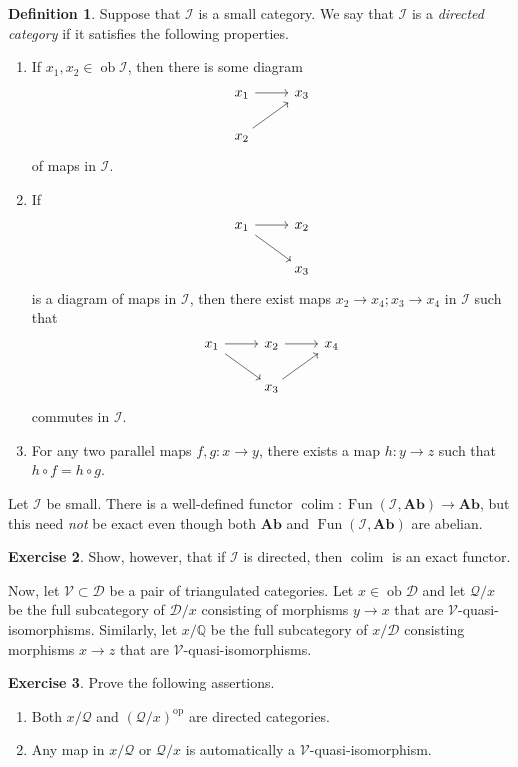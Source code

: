 \documentclass[10pt,letterpaper,cm]{nupset}
\theoremstyle{definition}
\newtheorem{definition}{Definition}[subsection]
\theoremstyle{theorem}
\newtheorem{exercise}[definition]{Exercise}
\theoremstyle{remark}
\newcommand{\Q}{\mathbb Q}
\newcommand{\1}{\mathbf{1}}
\renewcommand{\d}{\mathscr{D}}
\renewcommand{\i}{\mathscr{I}}
\newcommand{\q}{\mathscr{Q}}
\renewcommand{\v}{\mathscr{V}}
\newcommand{\0}{\vec 0}
\DeclareMathOperator{\op}{op}
\DeclareMathOperator{\ob}{ob}
\DeclareMathOperator{\Fun}{Fun}
\DeclareMathOperator{\colim}{colim}
\begin{document}
\begin{definition}
Suppose that $\i$ is a small category. We say that $\i$ is a \textit{directed category} if it satisfies the following properties.
\begin{enumerate}[label=(\arabic*)]
\item If $x_1, x_2 \in \ob{\i}$, then there is some diagram 
\[
\begin{tikzcd}
x_1 \arrow[r]  & x_3 \\
x_2 \arrow[ru] &    
\end{tikzcd}
\] of maps in $\i$.
\item If 
\[
\begin{tikzcd}
x_1 \arrow[r] \arrow[rd] & x_2 \\
                         & x_3
\end{tikzcd}
\] is a diagram of maps in $\i$, then there exist maps $x_2 \to x_4; x_3 \to x_4$ in $\i$ such that 
\[
\begin{tikzcd}
x_1 \arrow[r] \arrow[rd] & x_2 \arrow[r]  & x_4 \\
                         & x_3 \arrow[ru] &    
\end{tikzcd}
\] commutes in $\i$.
\item For any two parallel maps $f,g : x \to y$, there exists a map $h: y \to z$ such that $h \circ f = h \circ g$. 
\end{enumerate}
\end{definition}

\smallskip

Let $\i$ be small. There is a well-defined functor $\colim : \Fun(\i, \mathbf{Ab}) \to \mathbf{Ab}$, but this need \emph{not} be exact even though both $\mathbf{Ab}$ and $\Fun(\i, \mathbf{Ab})$ are abelian.

\begin{exercise}
 Show, however, that if $\i$ is directed, then $\colim$ is an exact functor. 
\end{exercise}

\smallskip

Now,  let $\v \subset \d$ be a pair of triangulated categories. Let $x \in \ob{\d}$ and let $\q/x$ be the full subcategory of $\d/x$ consisting of morphisms $y \to x$ that are $\v$-quasi-isomorphisms. Similarly, let $x/\Q$ be the full subcategory of $x/\d$ consisting morphisms $x \to z$ that are $\v$-quasi-isomorphisms. 


\begin{exercise} Prove the following assertions.
\begin{enumerate}
\item Both $x/ \q$ and $(\q/x)^{\op}$ are directed categories. 
\item Any map in $x/\q$ or $\q/x$ is automatically a $\v$-quasi-isomorphism. 
\end{enumerate}
\end{exercise}
\end{document}
